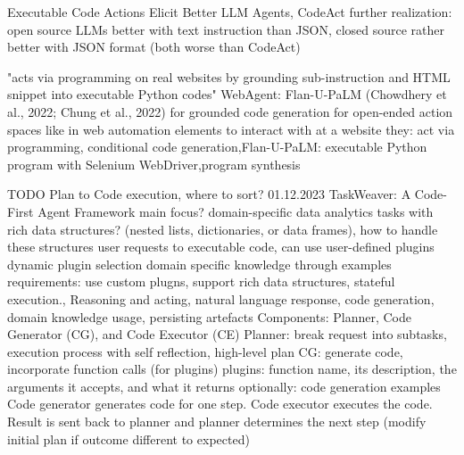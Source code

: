 \documentclass{article}
\begin{document}
\cite{wang_executable_2024} Executable Code Actions Elicit Better LLM Agents, CodeAct
further realization: open source LLMs better with text instruction than JSON, closed source rather better with JSON format (both worse than CodeAct)

\cite{gur_real-world_2023} "acts via programming on real websites by grounding sub-instruction and HTML snippet into executable Python codes" WebAgent: Flan-U-PaLM (Chowdhery et al., 2022; Chung et al., 2022) for grounded code generation
for open-ended action spaces like in web automation
elements to interact with at a website
they: act via programming, conditional code generation,Flan-U-PaLM: executable Python program with Selenium  WebDriver,program synthesis


TODO Plan to Code execution, where to sort?
\cite{qiao_taskweaver_2023} 01.12.2023 TaskWeaver: A Code-First Agent Framework
main focus? domain-specific data analytics tasks with rich data structures? (nested lists, dictionaries, or data frames), how to handle these structures
user requests to executable code, can use user-defined plugins
dynamic plugin selection
domain specific knowledge through examples
requirements: use custom plugns, support rich data structures, stateful execution., Reasoning and acting, natural language response, code generation, domain knowledge usage, persisting artefacts
Components: Planner, Code Generator (CG), and Code Executor (CE)
Planner: break request into subtasks, execution process with self reflection, high-level plan
CG: generate code, incorporate function calls (for plugins)
plugins: function name, its description, the arguments it accepts, and what it returns
optionally: code generation examples
Code generator generates code for one step. Code executor executes the code. Result is sent back to planner and planner determines the next step (modify initial plan if outcome different to expected)
\end{document}
